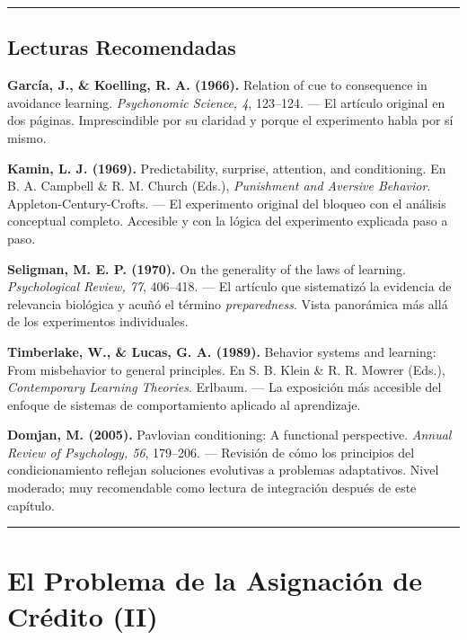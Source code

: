 \documentclass[
  letterpaper,
  DIV=11,
  numbers=noendperiod]{scrreprt}
\begin{document}
\begin{tcolorbox}[enhanced jigsaw, toprule=.15mm, arc=.35mm, colback=white, opacityback=0, colframe=quarto-callout-note-color-frame, breakable, rightrule=.15mm, left=2mm, leftrule=.75mm, bottomrule=.15mm]
\begin{center}\rule{0.5\linewidth}{0.5pt}\end{center}

\section{Lecturas Recomendadas}\label{lecturas-recomendadas}

\textbf{García, J., \& Koelling, R. A. (1966).} Relation of cue to
consequence in avoidance learning. \emph{Psychonomic Science, 4},
123--124. --- El artículo original en dos páginas. Imprescindible por su
claridad y porque el experimento habla por sí mismo.

\textbf{Kamin, L. J. (1969).} Predictability, surprise, attention, and
conditioning. En B. A. Campbell \& R. M. Church (Eds.), \emph{Punishment
and Aversive Behavior}. Appleton-Century-Crofts. --- El experimento
original del bloqueo con el análisis conceptual completo. Accesible y
con la lógica del experimento explicada paso a paso.

\textbf{Seligman, M. E. P. (1970).} On the generality of the laws of
learning. \emph{Psychological Review, 77}, 406--418. --- El artículo que
sistematizó la evidencia de relevancia biológica y acuñó el término
\emph{preparedness}. Vista panorámica más allá de los experimentos
individuales.

\textbf{Timberlake, W., \& Lucas, G. A. (1989).} Behavior systems and
learning: From misbehavior to general principles. En S. B. Klein \& R.
R. Mowrer (Eds.), \emph{Contemporary Learning Theories}. Erlbaum. --- La
exposición más accesible del enfoque de sistemas de comportamiento
aplicado al aprendizaje.

\textbf{Domjan, M. (2005).} Pavlovian conditioning: A functional
perspective. \emph{Annual Review of Psychology, 56}, 179--206. ---
Revisión de cómo los principios del condicionamiento reflejan soluciones
evolutivas a problemas adaptativos. Nivel moderado; muy recomendable
como lectura de integración después de este capítulo.

\begin{center}\rule{0.5\linewidth}{0.5pt}\end{center}


\chapter{El Problema de la Asignación de Crédito
(II)}\label{el-problema-de-la-asignaciuxf3n-de-cruxe9dito-ii}


\end{tcolorbox}
\end{document}
